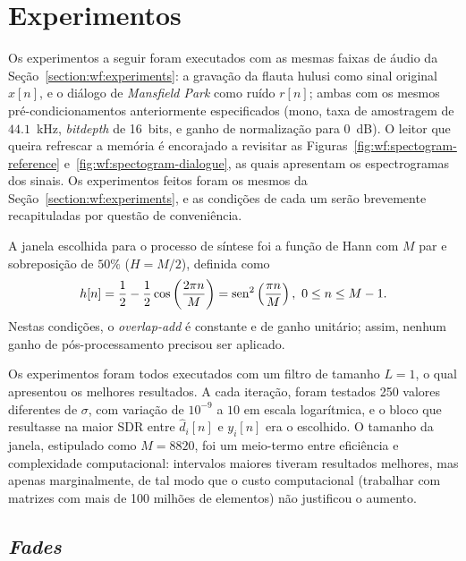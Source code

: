 \section{Experimentos}
\label{section:correntropy:experiments}

Os experimentos a seguir foram executados com as mesmas faixas de áudio da
Seção~\ref{section:wf:experiments}: a gravação da flauta hulusi como sinal original
$x[n]$, e o diálogo de \textit{Mansfield Park} como ruído $r[n]$; ambas com os mesmos
pré-condicionamentos anteriormente especificados (mono, taxa de amostragem de
$44.1$~kHz, \textit{bitdepth} de 16~bits, e ganho de normalização para 0~dB). O leitor
que queira refrescar a memória é encorajado a revisitar as
Figuras~\ref{fig:wf:spectogram-reference} e~\ref{fig:wf:spectogram-dialogue}, as quais
apresentam os espectrogramas dos sinais. Os experimentos feitos foram os mesmos da
Seção~\ref{section:wf:experiments}, e as condições de cada um serão brevemente
recapituladas por questão de conveniência.

A janela escolhida para o processo de síntese foi a função de Hann com $M$ par e
sobreposição de $50\%$ ($H = M/2$), definida como
\begin{equation}
	h[n] = \frac{1}{2} - \frac{1}{2}\cos\left(\frac{2\pi n}{M}\right) = \operatorname{sen}^2\left( \frac{\pi n}{M} \right),\ 0 \leq n \leq M-1.
\end{equation}
Nestas condições, o \textit{overlap-add} é constante e de ganho unitário; assim, nenhum ganho de pós-processamento precisou ser aplicado.

Os experimentos foram todos executados com um filtro de tamanho $L = 1$, o qual
apresentou os melhores resultados. A cada iteração, foram testados 250 valores
diferentes de $\sigma$, com variação de $10^{-9}$ a $10$ em escala logarítmica, e o
bloco que resultasse na maior SDR entre $\hat{d}_i[n]$ e $y_i[n]$ era o escolhido. O
tamanho da janela, estipulado como $M = 8820$, foi um meio-termo entre eficiência e
complexidade computacional: intervalos maiores tiveram resultados melhores, mas apenas
marginalmente, de tal modo que o custo computacional (trabalhar com matrizes com mais
de 100 milhões de elementos) não justificou o aumento.

\subsection{\textit{Fades}}

